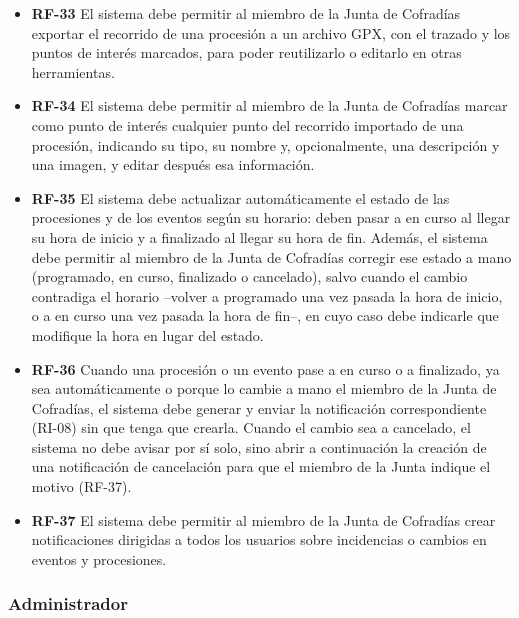 \begin{itemize}
    \item \textbf{RF-33}  El sistema debe permitir al miembro de la Junta de Cofradías exportar el recorrido de una procesión a un archivo GPX, con el trazado y los puntos de interés marcados, para poder reutilizarlo o editarlo en otras herramientas.

    \item \textbf{RF-34}  El sistema debe permitir al miembro de la Junta de Cofradías marcar como punto de interés cualquier punto del recorrido importado de una procesión, indicando su tipo, su nombre y, opcionalmente, una descripción y una imagen, y editar después esa información.

    \item \textbf{RF-35}  El sistema debe actualizar automáticamente el estado de las procesiones y de los eventos según su horario: deben pasar a en curso al llegar su hora de inicio y a finalizado al llegar su hora de fin. Además, el sistema debe permitir al miembro de la Junta de Cofradías corregir ese estado a mano (programado, en curso, finalizado o cancelado), salvo cuando el cambio contradiga el horario --volver a programado una vez pasada la hora de inicio, o a en curso una vez pasada la hora de fin--, en cuyo caso debe indicarle que modifique la hora en lugar del estado.

    \item \textbf{RF-36}  Cuando una procesión o un evento pase a en curso o a finalizado, ya sea automáticamente o porque lo cambie a mano el miembro de la Junta de Cofradías, el sistema debe generar y enviar la notificación correspondiente (RI-08) sin que tenga que crearla. Cuando el cambio sea a cancelado, el sistema no debe avisar por sí solo, sino abrir a continuación la creación de una notificación de cancelación para que el miembro de la Junta indique el motivo (RF-37).

    \item \textbf{RF-37}  El sistema debe permitir al miembro de la Junta de Cofradías crear notificaciones dirigidas a todos los usuarios sobre incidencias o cambios en eventos y procesiones.

\end{itemize}

\subsubsection{Administrador}

